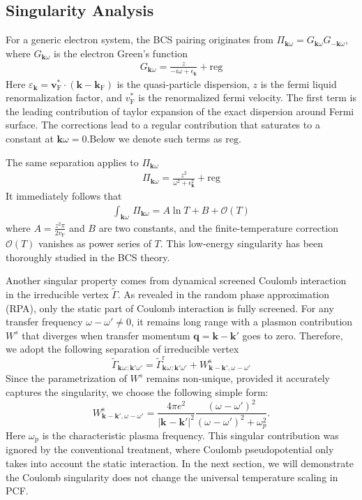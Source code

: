 \documentclass[%
 reprint,
superscriptaddress,
 amsmath,amssymb,
 aps,
prx,
]{revtex4-2}
\newcommand{\bq}{\mathbf{q}}
\newcommand{\bk}{\mathbf{k}}
\newcommand{\Gammapp}{\tilde{\Gamma}}
\newcommand{\txp}{\text{p}}
\newcommand{\txr}{\text{r}}
\newcommand{\txs}{\text{s}}
\newcommand{\txF}{\text{F}}
\begin{document}
\begin{appendices}
\subsection{Singularity Analysis}
For a generic electron system, the BCS pairing originates from $\Pi_{\bk\omega}=G_{\bk\omega}G_{-\bk\omega}$,
where $G_{\bk\omega}$ is the electron Green's function 
\begin{align}
\label{G}
  G_{\bk\omega} = \frac{z}{-i \omega + \epsilon_{\bk}}+\text{reg}
\end{align}
Here $\varepsilon_{\bk}=\mathbf{v}_\txF^*\cdot (\bk-\bk_\txF)$ is the quasi-particle dispersion, $z$ is the fermi liquid renormalization factor, and $v_\txF^*$ is the renormalized fermi velocity.  The first term is the leading contribution of taylor expansion of the exact dispersion around Fermi surface. The corrections lead to a regular contribution that saturates to a constant at $\bk\omega =0$.Below we denote such terms as $\text{reg}$.

The same separation applies to  $\Pi_{\bk\omega}$
\begin{gather}
	\label{G2limit}
\Pi_{\bk\omega} = \frac{z^{2}}{\omega^2+\epsilon_{\bk}^2} + \text{reg}
\end{gather}  
It immediately follows that
\begin{gather}
\label{eq:G2}
\int_{\bk\omega} \, \Pi_{\bk\omega}= A \ln {T} + B + \mathcal O(T)
\end{gather}
where $A = \frac{z^{2}\pi}{2v_\txF}$ and $B$ are two constants, and the finite-temperature correction $\mathcal O(T)$ vanishes as power series of $T$. This low-energy singularity has been thoroughly studied in the BCS theory.

Another singular property comes from dynamical screened Coulomb interaction in the irreducible vertex $\Gammapp$. As revealed in the random phase approximation (RPA), only the static part of Coulomb interaction is fully screened. For any transfer frequency $\omega-\omega'\neq 0$, it remains long range with a plasmon contribution $W^s$  that diverges when transfer momentum $\bq=\bk - \bk'$ goes to zero. Therefore, we adopt the following separation of irreducible vertex
\begin{equation}
    \label{eq:Gammapp_sep}
    \Gammapp_{\bk^{}\omega^{};\bk'\omega'} = \Gammapp^\txr_{\bk^{}\omega^{};\bk'\omega'} +    W^\txs_{\bk^{}-\bk', \omega^{}-\omega'}
\end{equation}
Since  the parametrization of $W^s$ remains non-unique, provided it accurately captures the singularity, we choose the following simple form:
\begin{equation}
\label{eq:plasmonsing}
    W^\txs_{\bk^{}-\bk', \omega^{}-\omega'} =\frac{4\pi e^2}{\left|\bk^{}-\bk'\right|^2} \frac{(\omega^{}-\omega')^2}{(\omega^{}-\omega')^2+\omega_p^2}.
\end{equation}
Here $\omega_\txp$ is the characteristic plasma frequency. This singular contribution was ignored by the conventional treatment, where Coulomb pseudopotential only takes into account the static interaction. In the next section, we will demonstrate the Coulomb singularity does not change the universal temperature scaling in PCF.


\end{appendices}
\end{document}

